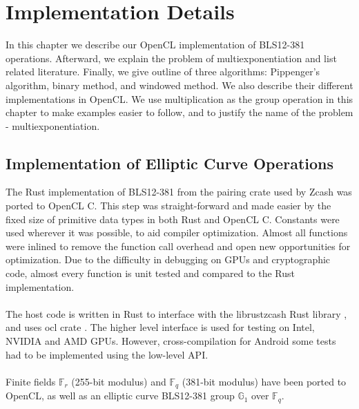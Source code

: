 \chapter{Implementation Details} %

\label{Chapter5} %

In this chapter we describe our OpenCL implementation of BLS12-381 operations. Afterward, we explain the problem of multiexponentiation and list related literature. Finally, we give outline of three algorithms: Pippenger's algorithm, binary method, and windowed method. We also describe their different implementations in OpenCL. We use multiplication as the group operation in this chapter to make examples easier to follow, and to justify the name of the problem - multiexponentiation.
\section{Implementation of Elliptic Curve Operations}


The Rust implementation of BLS12-381 from the pairing crate \cite{githubpairing} used by Zcash was ported to OpenCL C. This step was straight-forward and made easier by the fixed size of primitive data types in both Rust and OpenCL C. Constants were used wherever it was possible, to aid compiler optimization. Almost all functions were inlined to remove the function call overhead and open new opportunities for optimization. Due to the difficulty in debugging on GPUs and cryptographic code, almost every function is unit tested and compared to the Rust implementation.\\
\\
The host code is written in Rust to interface with the librustzcash Rust library \cite{githublibrustzcash}, and uses ocl crate \cite{githubocl}. The higher level interface is used for testing on Intel, NVIDIA and AMD GPUs. However, cross-compilation for Android some tests had to be implemented using the low-level API.\\
\\
Finite fields $\mathbb{F}_r$ (255-bit modulus) and $\mathbb{F}_q$ (381-bit modulus) have been ported to OpenCL, as well as an elliptic curve BLS12-381 group $\mathbb{G}_1$ over $\mathbb{F}_q$.

